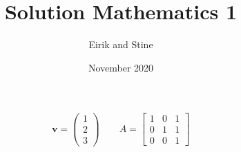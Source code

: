 \documentclass{article}
\title{Solution Mathematics 1}
\author{Eirik and Stine}
\date{November 2020}
\begin{document}
\maketitle

\[
\mathbf{v}=
\begin{pmatrix}
   1\\2\\3
\end{pmatrix}
\qquad 
A =
\begin{bmatrix}
   1&0&1\\
   0&1&1\\
   0&0&1
\end{bmatrix}\]
\end{document}
